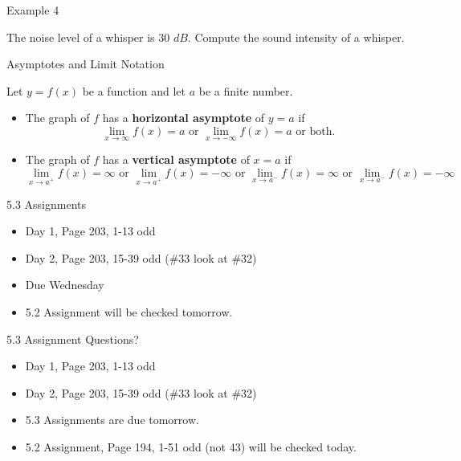 \documentclass[ignorenonframetext,]{beamer}
\providecommand{\tightlist}{%
  \setlength{\itemsep}{0pt}\setlength{\parskip}{0pt}}
\begin{document}
\begin{frame}{Example 4}

The noise level of a whisper is 30 \(dB\). Compute the sound intensity
of a whisper.

\end{frame}

\begin{frame}{Asymptotes and Limit Notation}

Let \(y = f(x)\) be a function and let \(a\) be a finite number.

\begin{itemize}
\tightlist
\item
  The graph of \(f\) has a \textbf{horizontal asymptote} of \(y = a\) if
  \[\lim_{x \to \infty} f(x) = a \text{ or } \lim_{x \to -\infty} f(x) = a \text{ or both.}\]
\item
  The graph of \(f\) has a \textbf{vertical asymptote} of \(x = a\) if
  \[\lim_{x \to a^+} f(x) = \infty \text{ or } \lim_{x \to a^+} f(x) = -\infty \text{ or } \lim_{x \to a^-} f(x) = \infty \text{ or } \lim_{x \to a^-} f(x) = -\infty\]
\end{itemize}

\end{frame}

\begin{frame}{5.3 Assignments}

\begin{itemize}
\tightlist
\item
  Day 1, Page 203, 1-13 odd
\item
  Day 2, Page 203, 15-39 odd (\#33 look at \#32)
\item
  Due Wednesday
\item
  5.2 Assignment will be checked tomorrow.
\end{itemize}

\end{frame}

\begin{frame}{5.3 Assignment Questions?}

\begin{itemize}
\tightlist
\item
  Day 1, Page 203, 1-13 odd
\item
  Day 2, Page 203, 15-39 odd (\#33 look at \#32)
\item
  5.3 Assignments are due tomorrow.
\item
  5.2 Assignment, Page 194, 1-51 odd (not 43) will be checked today.
\end{itemize}

\end{frame}
\end{document}
